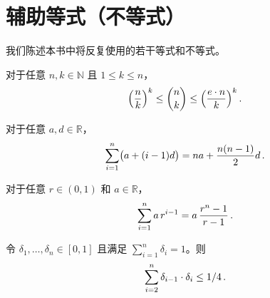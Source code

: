 \documentclass[american,singlepageview]{snargs-book-zh}
\renewcommand{\enspace}{\ensuremath{\thinspace}}
\newcommand{\Naturals}{\mathbb{N}}
\newcommand{\Reals}{\mathbb{R}}
\begin{document}
\section{辅助等式（不等式）}
\label{section:equalities-and-inequalities}

我们陈述本书中将反复使用的若干等式和不等式。

\begin{lemma}[二项式系数的界]
\label{lemma:binom-approx}
对于任意 $n,k\in\Naturals$ 且 $1\le k\le n$，
\begin{align*}
\Bigl(\frac{n}{k}\Bigr)^{k}
\le
\binom{n}{k}
\le
\Bigl(\frac{e\cdot n}{k}\Bigr)^{k}
\enspace.
\end{align*}
\end{lemma}

\begin{lemma}[等差级数]
\label{lemma:arithmetic-progression}
对于任意 $a,d\in\Reals$，
\begin{equation*}
\sum_{i=1}^{n}\bigl(a+(i-1)d\bigr)
=na+\frac{n(n-1)}{2}d
\enspace.
\end{equation*}
\end{lemma}

\begin{lemma}[等比级数]
\label{lemma:geometric-progression}
对于任意 $r\in(0,1)$ 和 $a\in\Reals$，
\begin{equation*}
\sum_{i=1}^{n}a\,r^{i-1}
=a\,\frac{r^{n}-1}{r-1}
\enspace.
\end{equation*}
\end{lemma}


\begin{lemma}
\label{lemma:sum-seq-prod}
令 $\delta_{1},\ldots,\delta_{n}\in[0,1]$ 且满足 $\sum_{i=1}^{n}\delta_{i}=1$。则
\begin{align*}
\sum_{i=2}^{n}\delta_{i-1}\cdot\delta_{i}\le1/4
\enspace.
\end{align*}
\end{lemma}
\end{document}
